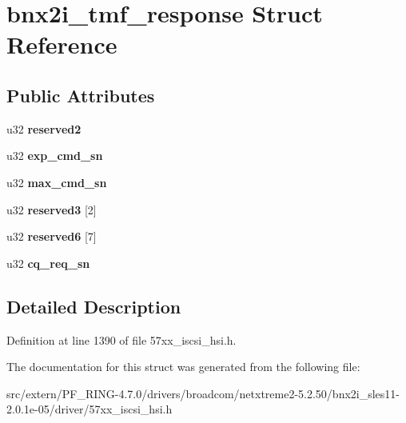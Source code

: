 \hypertarget{structbnx2i__tmf__response}{
\section{bnx2i\_\-tmf\_\-response Struct Reference}
\label{structbnx2i__tmf__response}
}
\subsection*{Public Attributes}
\begin{DoxyCompactItemize}
\item 
\hypertarget{structbnx2i__tmf__response_a2b7d5d2463cd3dd8f8bce9393bbac0a7}{
u32 {\bfseries reserved2}}
\label{structbnx2i__tmf__response_a2b7d5d2463cd3dd8f8bce9393bbac0a7}

\item 
\hypertarget{structbnx2i__tmf__response_a83832fef1c4b9b46220cdc9bef38033c}{
u32 {\bfseries exp\_\-cmd\_\-sn}}
\label{structbnx2i__tmf__response_a83832fef1c4b9b46220cdc9bef38033c}

\item 
\hypertarget{structbnx2i__tmf__response_ad15d6434aa7fdd01ddab0a22272ac8ed}{
u32 {\bfseries max\_\-cmd\_\-sn}}
\label{structbnx2i__tmf__response_ad15d6434aa7fdd01ddab0a22272ac8ed}

\item 
\hypertarget{structbnx2i__tmf__response_a487876bb794987a2f733c1371c366d7e}{
u32 {\bfseries reserved3} \mbox{[}2\mbox{]}}
\label{structbnx2i__tmf__response_a487876bb794987a2f733c1371c366d7e}

\item 
\hypertarget{structbnx2i__tmf__response_a75562e9f70d0601009f4b4b786903519}{
u32 {\bfseries reserved6} \mbox{[}7\mbox{]}}
\label{structbnx2i__tmf__response_a75562e9f70d0601009f4b4b786903519}

\item 
\hypertarget{structbnx2i__tmf__response_a8b47ee7a682ff0880810441f55ea493e}{
u32 {\bfseries cq\_\-req\_\-sn}}
\label{structbnx2i__tmf__response_a8b47ee7a682ff0880810441f55ea493e}

\end{DoxyCompactItemize}


\subsection{Detailed Description}


Definition at line 1390 of file 57xx\_\-iscsi\_\-hsi.h.



The documentation for this struct was generated from the following file:\begin{DoxyCompactItemize}
\item 
src/extern/PF\_\-RING-\/4.7.0/drivers/broadcom/netxtreme2-\/5.2.50/bnx2i\_\-sles11-\/2.0.1e-\/05/driver/57xx\_\-iscsi\_\-hsi.h\end{DoxyCompactItemize}
